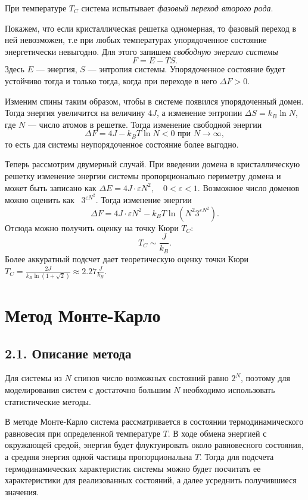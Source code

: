 \documentclass[12pt]{report}
\theoremstyle{definition}
\begin{document}
При температуре $T_C$ система испытывает \emph{фазовый переход второго рода}.

Покажем, что если кристаллическая решетка одномерная, то фазовый переход в ней невозможен, т.е при любых температурах
упорядоченное состояние энергетически невыгодно.
Для этого запишем \emph{свободную энергию системы}
\begin{equation}
    F = E - TS.
\end{equation}
Здесь  $E$ --- энергия, $S$ --- энтропия системы. Упорядоченное состояние будет устойчиво тогда и только тогда, когда
при переходе в него $\Delta F > 0$.

Изменим спины таким образом, чтобы в системе появился упорядоченный домен. Тогда энергия увеличится на величину $4J$, а изменение энтропии
$\Delta S = k_B \ln N$, где $N$ --- число атомов в решетке. Тогда изменение свободной энергии
\begin{equation}
    \Delta F = 4J - k_B T \ln N < 0 \text{ при }N \to \infty,
\end{equation}
то есть для системы неупорядоченное состояние более выгодно.

Теперь рассмотрим двумерный случай. При введении домена в кристаллическую решетку изменение энергии системы пропорционально периметру домена и может быть записано как
$\Delta E = 4J \cdot \varepsilon N^2, \quad 0 < \varepsilon < 1$. Возможное число доменов можно оценить как  $3^{\varepsilon N^2}$. Тогда изменение энергии
\begin{equation}
    \Delta F = 4J \cdot \varepsilon N^2 - k_B T \ln (N^2 3^{\varepsilon N^2}).
\end{equation}
Отсюда можно получить оценку на точку Кюри $T_C$:
\begin{equation}
    T_C \sim \dfrac{J}{k_B}.
\end{equation}
Более аккуратный подсчет дает теоретическую оценку точки Кюри $T_C = \frac{2J}{k_B\ln(1 + \sqrt{2})} \approx 2.27\frac{J}{k_B}.$
\chapter{Метод Монте-Карло}
\section{2.1. Описание метода}
Для системы из $N$ спинов число возможных состояний равно $2^N$, поэтому
для моделирования систем с достаточно большим $N$ необходимо использовать статистические методы.

В методе Монте-Карло система рассматривается в состоянии термодинамического равновесия при
определенной температуре $T$. В ходе обмена энергией с окружающей средой, энергия будет
флуктуировать около равновесного состояния, а средняя энергия одной частицы пропорциональна $T$.
Тогда для подсчета термодинамических характеристик системы можно будет посчитать ее характеристики для реализованных состояний,
а далее усреднить получившиеся значения.
\end{document}
